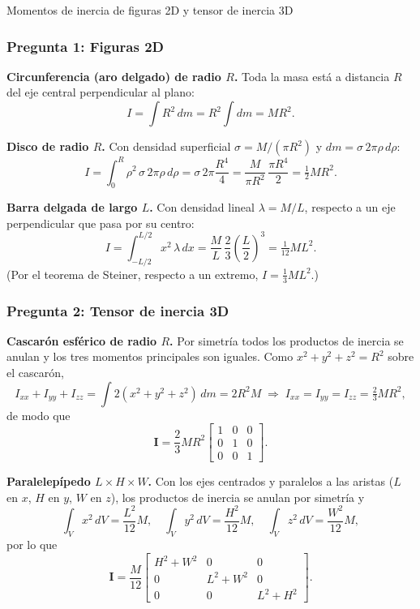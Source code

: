 \begin{solucion}{Momentos de inercia de figuras 2D y tensor de inercia 3D}
\subsubsection*{Pregunta 1: Figuras 2D}

\textbf{Circunferencia (aro delgado) de radio $R$.} Toda la masa está a distancia $R$ del
eje central perpendicular al plano:
$$I = \int R^2\,dm = R^2\!\int dm = \boxed{MR^2}.$$

\textbf{Disco de radio $R$.} Con densidad superficial $\sigma=M/(\pi R^2)$ y $dm=\sigma\,2\pi\rho\,d\rho$:
$$I = \int_0^R \rho^2\,\sigma\,2\pi\rho\,d\rho = \sigma\,2\pi\frac{R^4}{4}
= \frac{M}{\pi R^2}\,\frac{\pi R^4}{2} = \boxed{\tfrac12 MR^2}.$$

\textbf{Barra delgada de largo $L$.} Con densidad lineal $\lambda=M/L$, respecto a un eje
perpendicular que pasa por su centro:
$$I = \int_{-L/2}^{L/2} x^2\,\lambda\,dx = \frac{M}{L}\,\frac{2}{3}\left(\frac{L}{2}\right)^3
= \boxed{\tfrac{1}{12}ML^2}.$$
(Por el teorema de Steiner, respecto a un extremo, $I=\tfrac13 ML^2$.)

\subsubsection*{Pregunta 2: Tensor de inercia 3D}

\textbf{Cascarón esférico de radio $R$.} Por simetría todos los productos de inercia se
anulan y los tres momentos principales son iguales. Como $x^2+y^2+z^2=R^2$ sobre el cascarón,
$$I_{xx}+I_{yy}+I_{zz} = \int 2(x^2+y^2+z^2)\,dm = 2R^2 M \;\Rightarrow\; I_{xx}=I_{yy}=I_{zz}=\tfrac23 MR^2,$$
de modo que
$$\mathbf{I} = \frac{2}{3}MR^2
\begin{bmatrix} 1 & 0 & 0 \\ 0 & 1 & 0 \\ 0 & 0 & 1 \end{bmatrix}.$$

\textbf{Paralelepípedo $L\times H\times W$.} Con los ejes centrados y paralelos a las aristas
($L$ en $x$, $H$ en $y$, $W$ en $z$), los productos de inercia se anulan por simetría y
$$\int_V x^2\,dV = \frac{L^2}{12}M,\quad \int_V y^2\,dV = \frac{H^2}{12}M,\quad \int_V z^2\,dV = \frac{W^2}{12}M,$$
por lo que
$$\mathbf{I} = \frac{M}{12}
\begin{bmatrix} H^2+W^2 & 0 & 0 \\ 0 & L^2+W^2 & 0 \\ 0 & 0 & L^2+H^2 \end{bmatrix}.$$
\end{solucion}
